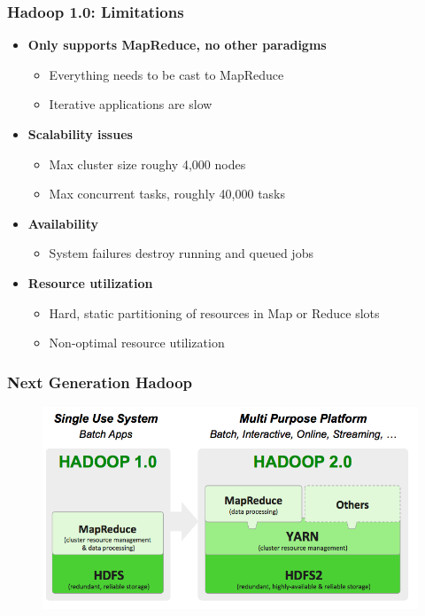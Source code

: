 \begin{frame}
\frametitle{Hadoop 1.0: Limitations}
\begin{itemize}
  \item {\bf Only supports MapReduce, no other paradigms}
  \begin{itemize}
    \item Everything needs to be cast to MapReduce
    \item Iterative applications are slow
  \end{itemize}
  \item {\bf Scalability issues}
  \begin{itemize}
    \item Max cluster size roughy 4,000 nodes
    \item Max concurrent tasks, roughly 40,000 tasks
  \end{itemize}
  \item {\bf Availability}
  \begin{itemize}
    \item System failures destroy running and queued jobs
  \end{itemize}
  \item {\bf Resource utilization}
  \begin{itemize}
    \item Hard, static partitioning of resources in Map or Reduce slots
    \item Non-optimal resource utilization
  \end{itemize}
\end{itemize}
\end{frame}

\begin{frame}
\frametitle{Next Generation Hadoop}
\begin{figure}[h]
  \centering
  \includegraphics[scale=0.4]{./figures/yarn_vision}
  \label{fig:yarn_vision}
\end{figure}
\end{frame}

